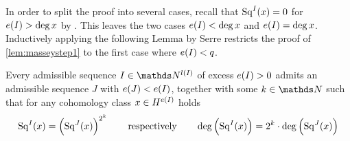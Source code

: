 In order to split the proof into several cases, recall that
$\mathrm{Sq}^{I}(x) = 0$ for $e(I)>\deg x$ by
. This leaves the two cases
$e(I)<\deg x$ and $e(I)=\deg x$.
Inductively applying the following Lemma by Serre restricts the
proof of \autoref{lem:masseystep1} to the first case where $e(I)<q$.
\begin{Lem}[Serre]
  \label{lem:serre}
  Every admissible sequence $I\in\Nat^{\l(I)}$ of excess $e(I)>0$
  admits an admissible sequence $J$ with $e(J)<e(I)$,
  together with some $k\in\Nat$
  such that for any cohomology class $x\in H^{e(I)}$ holds
  \begin{gather*}
    \mathrm{Sq}^{I}(x) = \left(\mathrm{Sq}^{J}(x)\right) ^{2^k}
    \qquad\text{respectively}\qquad
    \deg\left(\mathrm{Sq}^{I}(x)\right) = 2^k\cdot \deg\left(\mathrm{Sq}^{J}(x)\right)
  \end{gather*}
\end{Lem}

